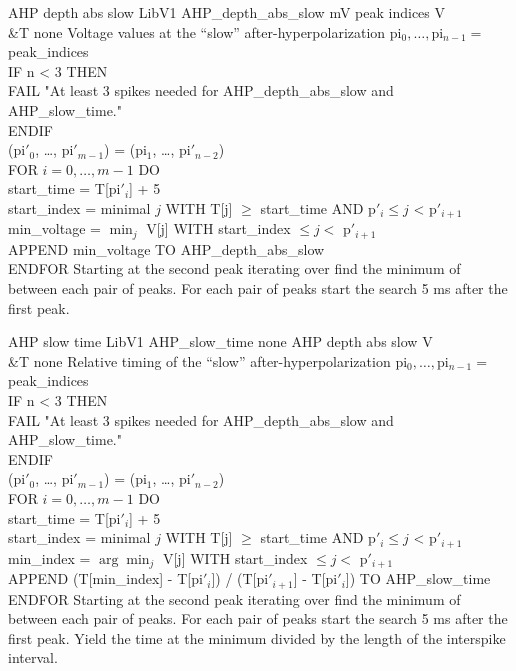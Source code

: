 \begin{efeature}
  {AHP depth abs slow}
  {LibV1}
  {AHP\_depth\_abs\_slow}
  {mV}
  {peak indices}
  {V\\&T}
  {none}
  {Voltage values at the ``slow'' after-hyperpolarization}
  {
  pi$_0, \ldots, $pi$_{n-1} =$ peak\_indices \\
  IF n < 3 THEN \+ \\
    FAIL "At least 3 spikes needed for AHP\_depth\_abs\_slow and AHP\_slow\_time." \- \\
  ENDIF \\
  (pi$'_0$, \ldots, pi$'_{m-1}$) = (pi$_1$, \ldots, pi$'_{n-2}$) \\
  FOR $i = 0, \dots, m - 1$ DO \+ \\
    start\_time = T[pi$'_i$] + 5 \\
    start\_index = minimal $j$ WITH T[j] $\ge$ start\_time AND p$'_i \le j$ < p$'_{i+1}$ \\
    min\_voltage = $\min_j$ V[j] WITH start\_index $\le j <$ p$'_{i+1}$ \\
    APPEND min\_voltage TO AHP\_depth\_abs\_slow \- \\
  ENDFOR
  }
  Starting at the second peak iterating over  find the minimum of  between each pair of peaks.
  For each pair of peaks start the search 5 ms after the first peak.
  
\end{efeature}

\begin{efeature}
  {AHP slow time}
  {LibV1}
  {AHP\_slow\_time}
  {none}
  {AHP depth abs slow}
  {V\\&T}
  {none}
  {Relative timing of the ``slow'' after-hyperpolarization}
  {
  pi$_0, \ldots, $pi$_{n-1} =$ peak\_indices \\
  IF n < 3 THEN \+ \\
    FAIL "At least 3 spikes needed for AHP\_depth\_abs\_slow and AHP\_slow\_time." \- \\
  ENDIF \\
  (pi$'_0$, \ldots, pi$'_{m-1}$) = (pi$_1$, \ldots, pi$'_{n-2}$) \\
  FOR $i = 0, \dots, m - 1$ DO \+ \\
    start\_time = T[pi$'_i$] + 5 \\
    start\_index = minimal $j$ WITH T[j] $\ge$ start\_time AND p$'_i \le j$ < p$'_{i+1}$ \\
    min\_index = $\arg\min_j$ V[j] WITH start\_index $\le j <$ p$'_{i+1}$ \\
    APPEND (T[min\_index] - T[pi$'_i$]) / (T[pi$'_{i+1}$] - T[pi$'_i$]) TO AHP\_slow\_time \- \\
  ENDFOR
  }
  Starting at the second peak iterating over  find the minimum of  between each pair of peaks.
  For each pair of peaks start the search 5 ms after the first peak.
  Yield the time at the minimum divided by the length of the interspike interval.
  
\end{efeature}

